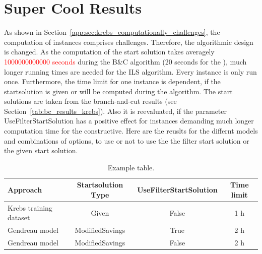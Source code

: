 \section{Super Cool Results}
\label{sec:results_krebs}
As shown in Section~\ref{app:sec:krebs_computationally_challenges}, the computation of \krebsADataSetText instances comprises
challenges. Therefore, the algorithmic design is changed. As the computation of the start solution takes averagely \textcolor{red}{1000000000000 seconds}
during the B\&C algorithm (20 seconds for the \gendreauDataSetText), much longer running times are needed for the \gls{ILS} algorithm.
Every instance is only run once. Furthermore, the time limit for one instance
is dependent, if the startsolution is given or will be computed during the algorithm. The start solutions are taken from the branch-and-cut
results (see Section~\ref{tab:bc_results_krebs}). Also it is reevaluated, if the parameter UseFilterStartSolution has a positive effect
for instances demanding much longer computation time for the constructive.
\parbreak
Here are the reuslts for the differnt models and combinations of options, to use or not to use the the filter start solution or the given start solution.

\begin{table}[ht]
    \centering
    \begin{tabular}{l c c c }
        \toprule
        Approach               & Startsolution Type & UseFilterStartSolution & Time limit \\
        \midrule
        Krebs training dataset & Given              & False                  & 1 h        \\
        Gendreau model         & ModifiedSavings    & True                   & 2 h        \\
        Gendreau model         & ModifiedSavings    & False                  & 2 h        \\
        \bottomrule
    \end{tabular}
    \caption{Example table.}
\end{table}
